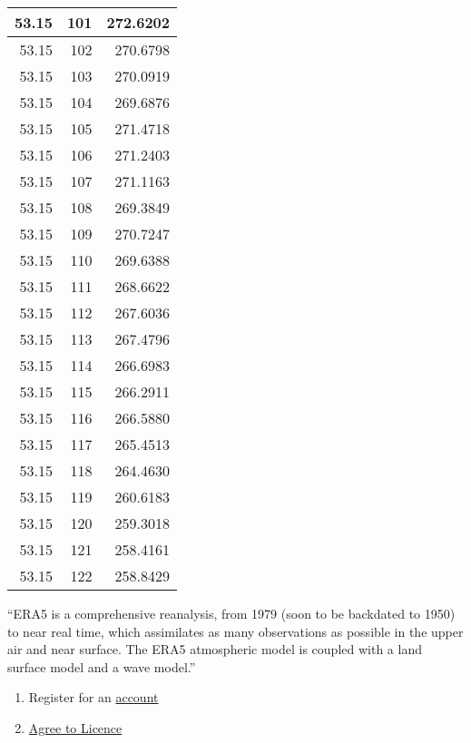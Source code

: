 \documentclass[
]{book}
\providecommand{\tightlist}{%
  \setlength{\itemsep}{0pt}\setlength{\parskip}{0pt}}
\begin{document}
\begin{table}[!h]
\begin{tabular}[t]{r|r|r}
\hline
\rowcolor{gray!6}  53.15 & 101 & 272.6202\\
\hline
53.15 & 102 & 270.6798\\
\hline
\rowcolor{gray!6}  53.15 & 103 & 270.0919\\
\hline
53.15 & 104 & 269.6876\\
\hline
\rowcolor{gray!6}  53.15 & 105 & 271.4718\\
\hline
53.15 & 106 & 271.2403\\
\hline
\rowcolor{gray!6}  53.15 & 107 & 271.1163\\
\hline
53.15 & 108 & 269.3849\\
\hline
\rowcolor{gray!6}  53.15 & 109 & 270.7247\\
\hline
53.15 & 110 & 269.6388\\
\hline
\rowcolor{gray!6}  53.15 & 111 & 268.6622\\
\hline
53.15 & 112 & 267.6036\\
\hline
\rowcolor{gray!6}  53.15 & 113 & 267.4796\\
\hline
53.15 & 114 & 266.6983\\
\hline
\rowcolor{gray!6}  53.15 & 115 & 266.2911\\
\hline
53.15 & 116 & 266.5880\\
\hline
\rowcolor{gray!6}  53.15 & 117 & 265.4513\\
\hline
53.15 & 118 & 264.4630\\
\hline
\rowcolor{gray!6}  53.15 & 119 & 260.6183\\
\hline
53.15 & 120 & 259.3018\\
\hline
\rowcolor{gray!6}  53.15 & 121 & 258.4161\\
\hline
53.15 & 122 & 258.8429\\
\hline
\end{tabular}
\end{table}

``ERA5 is a comprehensive reanalysis, from 1979 (soon to be backdated to 1950) to near real time, which assimilates as many observations as possible in the upper air and near surface. The ERA5 atmospheric model is coupled with a land surface model and a wave model.''

\begin{enumerate}
\def\labelenumi{\arabic{enumi}.}
\tightlist
\item
  Register for an \href{cds.climate.copernicus.eu}{account}
\item
  \href{https://cds.climate.copernicus.eu/cdsapp/\#!/terms/licence-to-use-copernicus-products}{Agree to Licence}
\end{enumerate}
\end{document}
